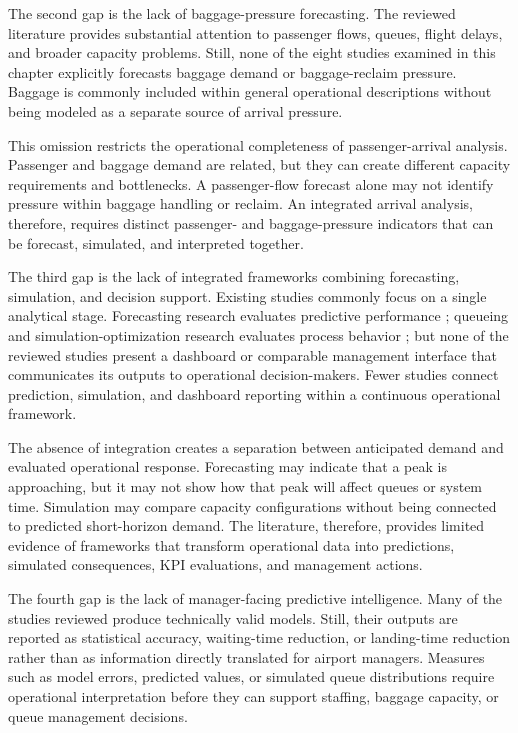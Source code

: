 The second gap is the lack of baggage-pressure forecasting. The reviewed literature provides substantial attention to passenger flows, queues, flight delays, and broader capacity problems. Still, none of the eight studies examined in this chapter explicitly forecasts baggage demand or baggage-reclaim pressure. Baggage is commonly included within general operational descriptions without being modeled as a separate source of arrival pressure.

This omission restricts the operational completeness of passenger-arrival analysis. Passenger and baggage demand are related, but they can create different capacity requirements and bottlenecks. A passenger-flow forecast alone may not identify pressure within baggage handling or reclaim. An integrated arrival analysis, therefore, requires distinct passenger- and baggage-pressure indicators that can be forecast, simulated, and interpreted together.

The third gap is the lack of integrated frameworks combining forecasting, simulation, and decision support. Existing studies commonly focus on a single analytical stage. Forecasting research evaluates predictive performance \parencite{orsini2019neural,shao2019flight,shao2022predicting,zhang2021spatiotemporal,zhu2024spatiotemporal}; queueing and simulation-optimization research evaluates process behavior \parencite{cao2025robust,pang2024machine,sang2026integrating}; but none of the reviewed studies present a dashboard or comparable management interface that communicates its outputs to operational decision-makers. Fewer studies connect prediction, simulation, and dashboard reporting within a continuous operational framework.

The absence of integration creates a separation between anticipated demand and evaluated operational response. Forecasting may indicate that a peak is approaching, but it may not show how that peak will affect queues or system time. Simulation may compare capacity configurations without being connected to predicted short-horizon demand. The literature, therefore, provides limited evidence of frameworks that transform operational data into predictions, simulated consequences, KPI evaluations, and management actions.

The fourth gap is the lack of manager-facing predictive intelligence. Many of the studies reviewed produce technically valid models. Still, their outputs are reported as statistical accuracy, waiting-time reduction, or landing-time reduction rather than as information directly translated for airport managers. Measures such as model errors, predicted values, or simulated queue distributions require operational interpretation before they can support staffing, baggage capacity, or queue management decisions.

